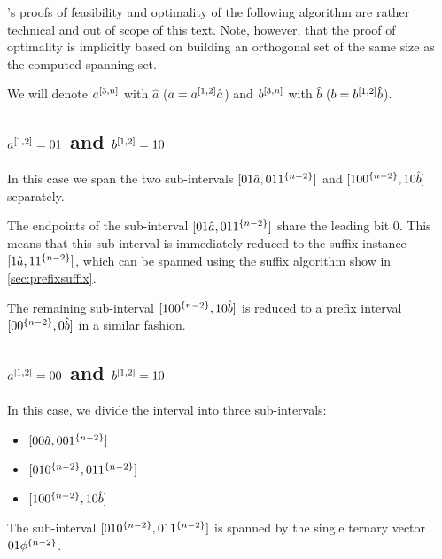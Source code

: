 \citeauthor{Schieber2005154}'s proofs of feasibility
and optimality of the following
algorithm are rather technical and out of scope
of this text.
Note, however, that the proof of optimality is implicitly
based on building an orthogonal set of the same size
as the computed spanning set.

We will denote $a^{[3, n]}$ with $\hat{a}$
($a = a^{[1, 2]} \hat{a}$)
and $b^{[3, n]}$ with $\hat{b}$
($b = b^{[1, 2]} \hat{b}$).

\subsection{\texorpdfstring
{$a^{[1, 2]} = 01$ and $b^{[1, 2]} = 10$}
{ = 01 and  = 10}
}
\label{sec:1interval0110}

In this case
we span the two sub-intervals
$[01 \hat{a}, 01 1^{\{n-2\}}]$
and
$[10 0^{\{n-2\}}, 10 \hat{b}]$
separately.

The endpoints of the sub-interval
$[01 \hat{a}, 01 1^{\{n-2\}}]$
share the leading bit $0$.
This means that this sub-interval is immediately
reduced to the suffix instance
$[1 \hat{a}, 1 1^{\{n-2\}}]$,
which can be spanned using the suffix algorithm
show in \autoref{sec:prefixsuffix}.

The remaining sub-interval
$[10 0^{\{n-2\}}, 10 \hat{b}]$
is reduced to a prefix interval
$[0 0^{\{n-2\}}, 0 \hat{b}]$
in a similar fashion.

\subsection{\texorpdfstring
{$a^{[1, 2]} = 00$ and $b^{[1, 2]} = 10$}
{ = 00 and  = 10}
}
\label{sec:0010}

In this case,
we divide the interval into three sub-intervals:

\begin{itemize}
\item $[00 \hat{a}, 00 1^{\{n-2\}}]$
\item $[01 0^{\{n-2\}}, 01 1^{\{n-2\}}]$
\item $[10 0^{\{n-2\}}, 10 \hat{b}]$
\end{itemize}

The sub-interval
$[01 0^{\{n-2\}}, 01 1^{\{n-2\}}]$
is spanned by the single ternary vector
$01 \phi^{\{n-2\}}$.

